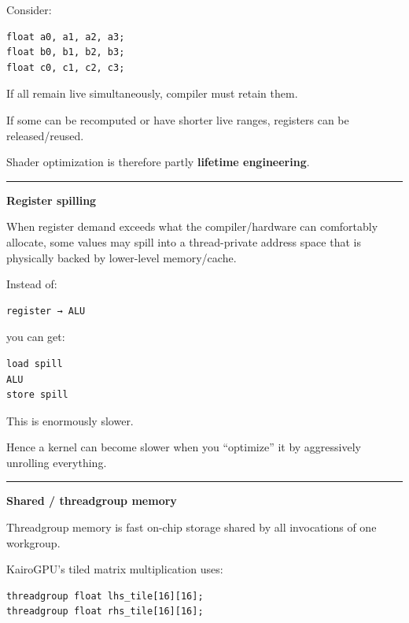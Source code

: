 Consider:

\protect{}\label{g2gruk}%
\begin{verbatim}
float a0, a1, a2, a3;
float b0, b1, b2, b3;
float c0, c1, c2, c3;
\end{verbatim}

If all remain live simultaneously, compiler must retain them.

If some can be recomputed or have shorter live ranges, registers can be released/reused.

Shader optimization is therefore partly \textbf{lifetime engineering}.

\begin{center}\rule{0.5\linewidth}{0.5pt}\end{center}

\textbf{Register spilling}

When register demand exceeds what the compiler/hardware can comfortably allocate, some values may spill into a thread-private address space that is physically backed by lower-level memory/cache.

Instead of:

\protect{}\label{i9imdl}%
\begin{verbatim}
register → ALU
\end{verbatim}

you can get:

\protect{}\label{x9gdnc}%
\begin{verbatim}
load spill
ALU
store spill
\end{verbatim}

This is enormously slower.

Hence a kernel can become slower when you ``optimize'' it by aggressively unrolling everything.

\begin{center}\rule{0.5\linewidth}{0.5pt}\end{center}

\textbf{Shared / threadgroup memory}

Threadgroup memory is fast on-chip storage shared by all invocations of one workgroup.

KairoGPU's tiled matrix multiplication uses:

\protect{}\label{mmlugb}%
\begin{verbatim}
threadgroup float lhs_tile[16][16];
threadgroup float rhs_tile[16][16];
\end{verbatim}

